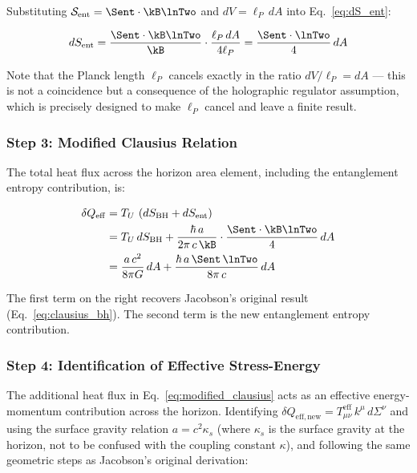 Substituting $\mathcal{S}_{\mathrm{ent}} = \Sent\cdot\kB\lnTwo$ and
$dV = \ell_P\,dA$ into Eq.~\eqref{eq:dS_ent}:

\begin{equation}
    dS_{\mathrm{ent}} = \frac{\Sent\cdot\kB\lnTwo}{\kB}\cdot
    \frac{\ell_P\,dA}{4\ell_P}
    = \frac{\Sent\cdot\lnTwo}{4}\,dA
    \label{eq:dS_ent_simplified}
\end{equation}

\noindent Note that the Planck length $\ell_P$ cancels exactly in the
ratio $dV/\ell_P = dA$ --- this is not a coincidence but a consequence
of the holographic regulator assumption, which is precisely designed to
make $\ell_P$ cancel and leave a finite result.

\subsubsection{Step 3: Modified Clausius Relation}

The total heat flux across the horizon area element, including the
entanglement entropy contribution, is:

\begin{align}
    \delta Q_{\mathrm{eff}} &= T_U\,\left(dS_{\mathrm{BH}}
    + dS_{\mathrm{ent}}\right) \nonumber \\
    &= T_U\,dS_{\mathrm{BH}}
    + \frac{\hbar\,a}{2\pi\,c\,\kB}\cdot
    \frac{\Sent\cdot\kB\lnTwo}{4}\,dA \nonumber \\
    &= \frac{a\,c^2}{8\pi G}\,dA
    + \frac{\hbar\,a\,\Sent\,\lnTwo}{8\pi\,c}\,dA
    \label{eq:modified_clausius}
\end{align}

\noindent The first term on the right recovers Jacobson's original result
(Eq.~\eqref{eq:clausius_bh}). The second term is the new entanglement
entropy contribution.

\subsubsection{Step 4: Identification of Effective Stress-Energy}

The additional heat flux in Eq.~\eqref{eq:modified_clausius} acts as an
effective energy-momentum contribution across the horizon. Identifying
$\delta Q_{\mathrm{eff,new}} = T^{\mathrm{eff}}_{\mu\nu}\,k^\mu\,
d\Sigma^\nu$ and using the surface gravity relation $a = c^2\kappa_s$
(where $\kappa_s$ is the surface gravity at the horizon, not to be confused
with the coupling constant $\kappa$), and following the same geometric steps
as Jacobson's original derivation:

